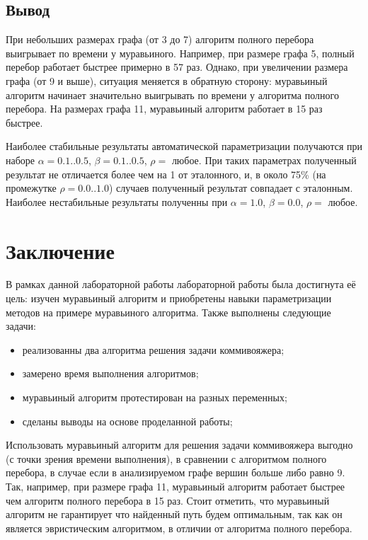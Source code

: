 \documentclass[12pt]{report}
\begin{document}
\begin{table}[H]
\begin{center}
	\end{center}

\end{table}

\section*{Вывод}

При небольших размерах графа (от 3 до 7) алгоритм полного перебора выигрывает по времени у муравьиного. Например, при размере графа 5, полный перебор работает быстрее примерно в 57 раз. Однако, при увеличении размера графа (от 9 и выше), ситуация меняется в обратную сторону: муравьиный алгоритм начинает значительно выигрывать по времени у алгоритма полного перебора. На размерах графа 11, муравьиный алгоритм работает в 15 раз быстрее.

Наиболее стабильные результаты автоматической параметризации получаются при наборе $\alpha = 0.1..0.5$, $\beta = 0.1..0.5$, $\rho = $ любое. При таких параметрах полученный результат не отличается более чем на 1 от эталонного, и, в около 75\% (на промежутке $\rho = 0.0..1.0$) случаев полученный результат совпадает с эталонным. Наиболее нестабильные результаты полученны при $\alpha = 1.0$, $\beta = 0.0$, $\rho = $ любое.

\chapter*{Заключение}
	
В рамках данной лабораторной работы лабораторной работы была достигнута её цель: изучен муравьиный алгоритм и приобретены навыки параметризации методов на примере муравьиного алгоритма. Также выполнены следующие задачи:
	
\begin{itemize}
	\item реализованны два алгоритма решения задачи коммивояжера;
	\item замерено время выполнения алгоритмов;
	\item муравьиный алгоритм протестирован на разных переменных;
	\item сделаны выводы на основе проделанной работы;
\end{itemize}

Использовать муравьиный алгоритм для решения задачи коммивояжера выгодно (с точки зрения времени выполнения), в сравнении с алгоритмом полного перебора, в случае если в анализируемом графе вершин больше либо равно 9. Так, например, при размере графа 11, муравьиный алгоритм работает быстрее чем алгоритм полного перебора в 15 раз. Стоит отметить, что муравьиный алгоритм не гарантирует что найденный путь будем оптимальным, так как он является эвристическим алгоритмом, в отличии от алгоритма полного перебора.

	
\end{document}
